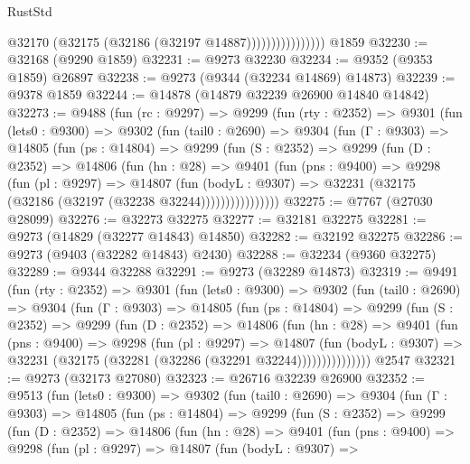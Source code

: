 \begin{lexlean}{RustStd}
\begin{coremodule}
{\begin{coremodule}
{{{{{{{{{{{{{{{{{{{{{{{{{{{{{{{{{{{{{{{{{{{{{{{{{{{{{{{                            @32170 (@32175 (@32186 (@32197 @14887))))))))))))))))
    @1859
@32230 := @32168 (@9290 @1859)
@32231 := @9273 @32230
@32234 := @9352 (@9353 @1859) @26897
@32238 := @9273 (@9344 (@32234 @14869) @14873)
@32239 := @9378 @1859
@32244 := @14878 (@14879 @32239 @26900 @14840 @14842)
@32273 := @9488
    (fun (rc : @9297) =>
    @9299
      (fun (rty : @2352) =>
      @9301
        (fun (lets0 : @9300) =>
        @9302
          (fun (tail0 : @2690) =>
          @9304
            (fun (Γ : @9303) =>
            @14805
              (fun (ps : @14804) =>
              @9299
                (fun (S : @2352) =>
                @9299
                  (fun (D : @2352) =>
                  @14806
                    (fun (hn : @28) =>
                    @9401
                      (fun (pns : @9400) =>
                      @9298
                        (fun (pl : @9297) =>
                        @14807
                          (fun (bodyL : @9307) =>
                          @32231 (@32175 (@32186 (@32197 (@32238 @32244))))))))))))))))
@32275 := @7767 (@27030 @28099)
@32276 := @32273 @32275
@32277 := @32181 @32275
@32281 := @9273 (@14829 (@32277 @14843) @14850)
@32282 := @32192 @32275
@32286 := @9273 (@9403 (@32282 @14843) @2430)
@32288 := @32234 (@9360 @32275)
@32289 := @9344 @32288
@32291 := @9273 (@32289 @14873)
@32319 := @9491
    (fun (rty : @2352) =>
    @9301
      (fun (lets0 : @9300) =>
      @9302
        (fun (tail0 : @2690) =>
        @9304
          (fun (Γ : @9303) =>
          @14805
            (fun (ps : @14804) =>
            @9299
              (fun (S : @2352) =>
              @9299
                (fun (D : @2352) =>
                @14806
                  (fun (hn : @28) =>
                  @9401
                    (fun (pns : @9400) =>
                    @9298
                      (fun (pl : @9297) =>
                      @14807
                        (fun (bodyL : @9307) =>
                        @32231 (@32175 (@32281 (@32286 (@32291 @32244)))))))))))))))
    @2547
@32321 := @9273 (@32173 @27080)
@32323 := @26716 @32239 @26900
@32352 := @9513
    (fun (lets0 : @9300) =>
    @9302
      (fun (tail0 : @2690) =>
      @9304
        (fun (Γ : @9303) =>
        @14805
          (fun (ps : @14804) =>
          @9299
            (fun (S : @2352) =>
            @9299
              (fun (D : @2352) =>
              @14806
                (fun (hn : @28) =>
                @9401
                  (fun (pns : @9400) =>
                  @9298
                    (fun (pl : @9297) =>
                    @14807
                      (fun (bodyL : @9307) =>
}}}}}}}}}}}}}}}}}}}}}}}}}}}}}}}}}}}}}}}}}}}}}}}}}}}}}}}
\end{coremodule}}
\end{coremodule}
\end{lexlean}
